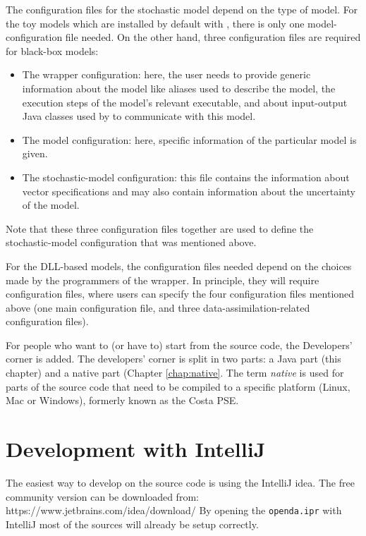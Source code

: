 The configuration files for the stochastic model depend on the type of model. For the toy models which are installed by default with \oda, there is only one model-configuration file needed. On the other hand, three configuration files are required for black-box models: 
\begin{itemize}
\item The wrapper configuration: here, the user needs to provide generic information about the model like aliases used to describe the model, the execution steps of the model’s relevant executable, and about input-output Java classes used by \oda to communicate with this model.
\item The model configuration: here, specific information of the particular model is given.
\item The stochastic-model configuration: this file contains the information about vector specifications and may also contain information about the uncertainty of the model. 
\end{itemize}
Note that these three configuration files together are used to define the stochastic-model configuration that was mentioned above.

For the DLL-based models, the configuration files needed depend on the choices made by the programmers of the \oda wrapper. In principle, they will require configuration files, where users can specify the four configuration files mentioned above (one main configuration file, and three data-assimilation-related configuration files). 



\label{chap:Java}
For people who want to (or have to) start from the \oda source code, the Developers' corner is added. The developers' corner is split in two parts: a Java part (this chapter) and a native part (Chapter \ref{chap:native}. The term \emph{native} is used for parts of the source code that need to be compiled to a specific platform (Linux, Mac or Windows), formerly known as the Costa PSE.

\section{Development with IntelliJ}
The easiest way to develop on the \oda source code is using the IntelliJ idea.
The free community version can be downloaded from: https://www.jetbrains.com/idea/download/
By opening the \verb|openda.ipr| with IntelliJ most of the sources will already be setup correctly.

